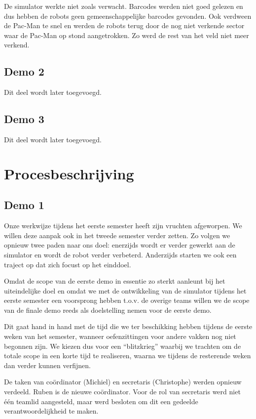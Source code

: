 \documentclass[12pt,a4paper]{report}
\begin{document}
De simulator werkte niet zoals verwacht. Barcodes werden niet goed gelezen en dus hebben de robots geen gemeenschappelijke barcodes gevonden. Ook verdween de Pac-Man te snel en werden de robots terug door de nog niet verkende sector waar de Pac-Man op stond aangetrokken. Zo werd de rest van het veld niet meer verkend.

\section{Demo 2}

Dit deel wordt later toegevoegd.

\section{Demo 3}

Dit deel wordt later toegevoegd.

\chapter{Procesbeschrijving}
\label{ch:process}

\section{Demo 1}

Onze werkwijze tijdens het eerste semester heeft zijn vruchten afgeworpen. We willen deze aanpak ook in het tweede semester verder zetten. Zo volgen we opnieuw twee paden naar ons doel: enerzijds wordt er verder gewerkt aan de simulator en wordt de robot verder verbeterd. Anderzijds starten we ook een traject op dat zich focust op het einddoel.

Omdat de scope van de eerste demo in essentie zo sterkt aanleunt bij het uiteindelijke doel en omdat we met de ontwikkeling van de simulator tijdens het eerste semester een voorsprong hebben t.o.v. de overige teams willen we de scope van de finale demo reeds als doelstelling nemen voor de eerste demo.

Dit gaat hand in hand met de tijd die we ter beschikking hebben tijdens de eerste weken van het semester, wanneer oefenzittingen voor andere vakken nog niet begonnen zijn. We kiezen dus voor een ``blitzkrieg'' waarbij we trachten om de totale scope in een korte tijd te realiseren, waarna we tijdens de resterende weken dan verder kunnen verfijnen.

De taken van co\"ordinator (Michiel) en secretaris (Christophe) werden opnieuw verdeeld. Ruben is de nieuwe co\"ordinator. Voor de rol van secretaris werd niet \'e\'en teamlid aangesteld, maar werd besloten om dit een gedeelde verantwoordelijkheid te maken.
\end{document}
